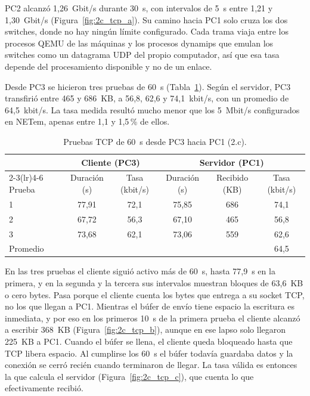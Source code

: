 \documentclass[11pt]{article}
\begin{document}
PC2 alcanzó 1,26~Gbit/s durante 30~s, con intervalos de 5~s entre 1,21 y 1,30~Gbit/s (Figura~\ref{fig:2c_tcp_a}). Su camino hacia PC1 solo cruza los dos switches, donde no hay ningún límite configurado. Cada trama viaja entre los procesos QEMU de las máquinas y los procesos dynamips que emulan los switches como un datagrama UDP del propio computador, así que esa tasa depende del procesamiento disponible y no de un enlace.

Desde PC3 se hicieron tres pruebas de 60~s (Tabla~\ref{tab:2c_tcp}). Según el servidor, PC3 transfirió entre 465 y 686~KB, a 56,8, 62,6 y 74,1~kbit/s, con un promedio de 64,5~kbit/s. La tasa medida resultó mucho menor que los 5~Mbit/s configurados en NETem, apenas entre 1,1 y 1,5\,\% de ellos.

\begin{table}[H]
\centering
\small
\caption{Pruebas TCP de 60~s desde PC3 hacia PC1 (2.c).}
\label{tab:2c_tcp}
\begin{tabular}{lccccc}
\toprule
 & \multicolumn{2}{c}{Cliente (PC3)} & \multicolumn{3}{c}{Servidor (PC1)} \\
\cmidrule(lr){2-3}\cmidrule(lr){4-6}
Prueba & Duración (s) & Tasa (kbit/s) & Duración (s) & Recibido (KB) & Tasa (kbit/s) \\
\midrule
1 & 77,91 & 72,1 & 75,85 & 686 & 74,1 \\
2 & 67,72 & 56,3 & 67,10 & 465 & 56,8 \\
3 & 73,68 & 62,1 & 73,06 & 559 & 62,6 \\
\midrule
Promedio & & & & & 64,5 \\
\bottomrule
\end{tabular}
\end{table}

En las tres pruebas el cliente siguió activo más de 60~s, hasta 77,9~s en la primera, y en la segunda y la tercera sus intervalos muestran bloques de 63,6~KB o cero bytes. Pasa porque el cliente cuenta los bytes que entrega a su socket TCP, no los que llegan a PC1. Mientras el búfer de envío tiene espacio la escritura es inmediata, y por eso en los primeros 10~s de la primera prueba el cliente alcanzó a escribir 368~KB (Figura~\ref{fig:2c_tcp_b}), aunque en ese lapso solo llegaron 225~KB a PC1. Cuando el búfer se llena, el cliente queda bloqueado hasta que TCP libera espacio. Al cumplirse los 60~s el búfer todavía guardaba datos y la conexión se cerró recién cuando terminaron de llegar. La tasa válida es entonces la que calcula el servidor (Figura~\ref{fig:2c_tcp_c}), que cuenta lo que efectivamente recibió.
\end{document}
